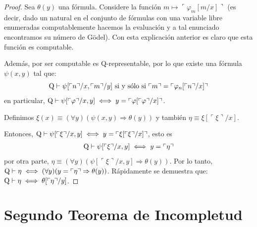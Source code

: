 \documentclass[12pt]{report}
\newcounter{it}
\theoremstyle{largebreak}
\newcommand{\winecomma}[1]{\ensuremath{\ulcorner#1\urcorner}}
\begin{document}
    \begin{proof}
        Sea $\theta(y)$ una fórmula. Considere la función $m\mapsto\winecomma{\varphi_m[m/x]}$ (es decir, dado un natural en el conjunto de fórmulas con una variable libre enumeradas computablemente hacemos la evaluación y a tal enunciado encontramos su número de Gödel). Con esta explicación anterior es claro que esta función es computable.

        Además, por ser computable es Q-representable, por lo que existe una fórmula $\psi(x,y)$ tal que:
        \begin{equation*}
            \RA\vdash\psi[\winecomma{n}/x,\winecomma{m}/y]\textup{ si y sólo si }\winecomma{m}=\winecomma{\varphi_n[\winecomma{n}/x]}
        \end{equation*}
        en particular, $\RA\vdash\psi[\winecomma{\varphi}/x,y]\iff y=\winecomma{\varphi[\winecomma{\varphi}/x]}$.

        Definimos $\xi(x)\equiv(\forall y)(\psi(x,y)\Rightarrow\theta(y))$ y también $\eta\equiv\xi[\winecomma{\xi}/x]$.

        Entonces, $\RA\vdash\psi[\winecomma{\xi}/x,y]\iff y=\winecomma{\xi[\winecomma{\xi}/x]}$, esto es
        \begin{equation*}
            \begin{split}
                \RA&\vdash\psi[\winecomma{\xi}/x,y]\iff y=\winecomma{\eta}\\
            \end{split}
        \end{equation*}
        por otra parte, $\eta\equiv(\forall y)(\psi[\winecomma{\xi}/x,y]\Rightarrow\theta(y))$. Por lo tanto, $\RA\vdash\eta\iff(\forall y)(y=\winecomma{\eta}\Rightarrow\theta(y))$. Rápidamente se demuestra que: $\RA\vdash\eta\iff\theta[\winecomma{\eta}/y]$.
    \end{proof}

    \section{Segundo Teorema de Incompletud}
\end{document}
